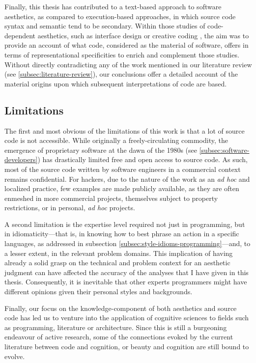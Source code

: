 Finally, this thesis has contributed to a text-based approach to software aesthetics, as compared to execution-based approaches, in which source code syntax and semantic tend to be secondary. Within those studies of code-dependent aesthetics, such as interface design \citep{fishwick_aesthetic_2000} or creative coding \citep{cox_aesthetic_2020}, the aim was to provide an account of what code, considered as the material of software, offers in terms of representational specificities to enrich and complement those studies. Without directly contradicting any of the work mentioned in our literature review (see \ref{subsec:literature-review}), our conclusions offer a detailed account of the material origins upon which subsequent interpretations of code are based.

\subsection{Limitations}
\label{subsec:conclusion-limitations}

The first and most obvious of the limitations of this work is that a lot of source code is not accessible. While originally a freely-circulating commodity, the emergence of proprietary software at the dawn of the 1980s (see \ref{subsec:software-developers}) has drastically limited free and open access to source code. As such, most of the source code written by software engineers in a commercial context remains confidential. For hackers, due to the nature of the work as an \emph{ad hoc} and localized practice, few examples are made publicly available, as they are often enmeshed in more commercial projects, themselves subject to property restrictions, or in personal, \emph{ad hoc} projects.

A second limitation is the expertise level required not just in programming, but in idiomaticity—that is, in knowing how to best phrase an action in a specific languages, as addressed in subsection \ref{subsec:style-idioms-programming}—and, to a lesser extent, in the relevant problem domains. This implication of having already a solid grasp on the technical and problem context for an aesthetic judgment can have affected the accuracy of the analyses that I have given in this thesis. Consequently, it is inevitable that other experts programmers might have different opinions given their personal styles and backgrounds.

Finally, our focus on the knowledge-component of both aesthetics and source code has led us to venture into the application of cognitive sciences to fields such as programming, literature or architecture. Since this is still a burgeoning endeavour of active research,  some of the connections evoked by the current literature between code and cognition, or beauty and cognition are still bound to evolve.

